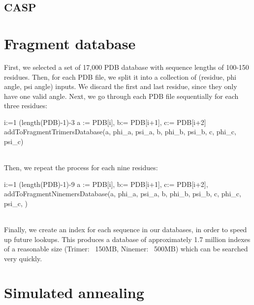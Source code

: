 \documentclass{article}
\begin{document}
\subsection{CASP}

\section{Fragment database}

First, we selected a set of 17,000 PDB database with sequence lengths of 100-150 residues.  Then, for each PDB file, we split it into a collection of (residue, phi angle, psi angle) inputs.  We discard the first and last residue, since they only have one valid angle.  Next, we go through each PDB file sequentially for each three residues:
\begin{program}

  \FOR i:=1 \TO (length(PDB)-1)-3  \DO
	a := PDB[i], b:= PDB[i+1], c:= PDB[i+2]
     	addToFragmentTrimersDatabase(a, phi_a, psi_a, b, phi_b, psi_b, c, phi_c, psi_c)\\\\
\END
\end{program}

Then, we repeat the process for each nine residues:

\begin{program}
  \FOR i:=1 \TO (length(PDB)-1)-9  \DO
	a := PDB[i], b:= PDB[i+1], c:= PDB[i+2],  \dotso
	addToFragmentNinemersDatabase(a, phi_a, psi_a, b, phi_b, psi_b, c, phi_c, psi_c, \dotso)\\\\
\END
\end{program}

Finally, we create an index for each sequence in our databases, in order to speed up future lookups.  This produces a database of approximately 1.7 million indexes of a reasonable size (Trimer: ~150MB, Ninemer: ~500MB) which can be searched very quickly.

\section{Simulated annealing}
\end{document}
